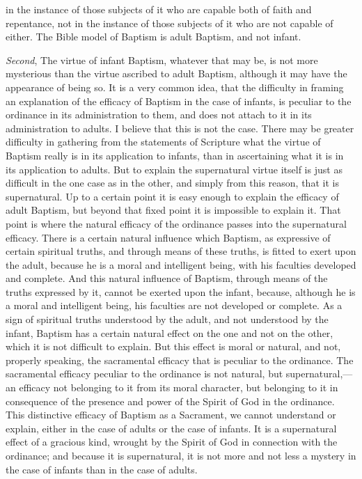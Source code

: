\documentclass[
]{book}
\begin{document}
in the instance of those subjects of it who are capable both of faith and repentance, not in the instance of those subjects of it who are not capable of either. The Bible model of Baptism is adult Baptism, and not infant.

\emph{Second}, The virtue of infant Baptism, whatever that may be, is not more mysterious than the virtue ascribed to adult Baptism, although it may have the appearance of being so. It is a very common idea, that the difficulty in framing an explanation of the efficacy of Baptism in the case of infants, is peculiar to the ordinance in its administration to them, and does not attach to it in its administration to adults. I believe that this is not the case. There may be greater difficulty in gathering from the statements of Scripture what the virtue of Baptism really is in its application to infants, than in ascertaining what it is in its application to adults. But to explain the supernatural virtue itself is just as difficult in the one case as in the other, and simply from this reason, that it is supernatural. Up to a certain point it is easy enough to explain the efficacy of adult Baptism, but beyond that fixed point it is impossible to explain it. That point is where the natural efficacy of the ordinance passes into the supernatural efficacy. There is a certain natural influence which Baptism, as expressive of certain spiritual truths, and through means of these truths, is fitted to exert upon the adult, because he is a moral and intelligent being, with his faculties developed and complete. And this natural influence of Baptism, through means of the truths expressed by it, cannot be exerted upon the infant, because, although he is a moral and intelligent being, his faculties are not developed or complete. As a sign of spiritual truths understood by the adult, and not understood by the infant, Baptism has a certain natural effect on the one and not on the other, which it is not difficult to explain. But this effect is moral or natural, and not, properly speaking, the sacramental efficacy that is peculiar to the ordinance. The sacramental efficacy peculiar to the ordinance is not natural, but supernatural,---an efficacy not belonging to it from its moral character, but belonging to it in consequence of the presence and power of the Spirit of God in the ordinance. This distinctive efficacy of Baptism as a Sacrament, we cannot understand or explain, either in the case of adults or the case of infants. It is a supernatural effect of a gracious kind, wrought by the Spirit of God in connection with the ordinance; and because it is supernatural, it is not more and not less a mystery in the case of infants than in the case of adults.
\end{document}
